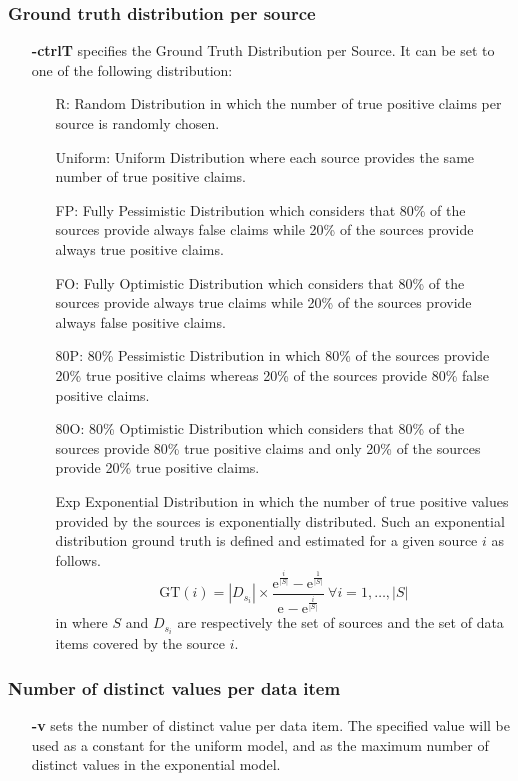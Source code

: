 \documentclass[a4paper,10pt]{scrartcl}
\newcommand{\expo}[1]{\ensuremath{\mathrm{e}^{#1}}}
\newcommand{\gt}[1]{\ensuremath{\mathrm{GT}(#1)}}
\begin{document}
\subsubsection{Ground truth distribution per source}
\begin{itemize}
 \item[\textbf{-ctrlT}] specifies the Ground Truth Distribution per Source. It can be set to one of the following distribution:
 \begin{itemize}
  \item[R:] Random Distribution in which the number of true positive claims per source is randomly chosen.
  \item[Uniform:] Uniform Distribution where each source provides the same number of true positive claims.
  \item[FP:] Fully Pessimistic Distribution which considers that 80\% of the sources provide always false claims
  while 20\% of the sources provide always true positive claims.
  \item[FO:] Fully Optimistic Distribution which considers that 80\% of the sources provide always true claims
  while 20\% of the sources provide always false positive claims.
  \item[80P:] 80\% Pessimistic Distribution in which 80\% of the sources provide 20\% true positive claims whereas
  20\% of the sources provide 80\% false positive claims. 
  \item[80O:] 80\% Optimistic Distribution which considers that 80\% of the sources provide 80\% true positive claims 
  and only 20\% of the sources provide 20\% true positive claims.
  \item[Exp] Exponential Distribution in which the number of true positive values provided by the sources is exponentially
  distributed. Such an exponential distribution ground truth is defined and estimated for a given source $i$ as follows.
  \[
   \gt{i} = |D_{s_i}| \times \frac{\expo{\frac{i}{|S|}} - \expo{\frac{1}{|S|}}}{\expo{} - \expo{\frac{i}{|S|}}}~\forall i= 1, \ldots,|S|
  \]
in where $S$ and $D_{s_i}$ are respectively the set of sources and the set of data items covered by the source $i$.
 \end{itemize}
\end{itemize}
\subsubsection{Number of distinct values per data item}
\begin{itemize}
 \item[\textbf{-v}] sets the number of distinct value per data item. The specified value will be used as a constant for the uniform 
 model, and as the maximum number of distinct values in the exponential model.
\end{itemize}
\end{document}
